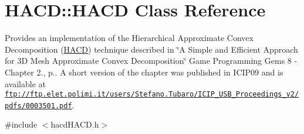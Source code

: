 \hypertarget{class_h_a_c_d_1_1_h_a_c_d}{\section{H\+A\+C\+D\+:\+:H\+A\+C\+D Class Reference}
\label{class_h_a_c_d_1_1_h_a_c_d}
}


Provides an implementation of the Hierarchical Approximate Convex Decomposition (\hyperlink{class_h_a_c_d_1_1_h_a_c_d}{H\+A\+C\+D}) technique described in \char`\"{}\+A Simple and Efficient Approach for 3\+D Mesh Approximate Convex Decomposition\char`\"{} Game Programming Gems 8 -\/ Chapter 2., p.. A short version of the chapter was published in I\+C\+I\+P09 and is available at \href{ftp://ftp.elet.polimi.it/users/Stefano.Tubaro/ICIP_USB_Proceedings_v2/pdfs/0003501.pdf}{\tt ftp\+://ftp.\+elet.\+polimi.\+it/users/\+Stefano.\+Tubaro/\+I\+C\+I\+P\+\_\+\+U\+S\+B\+\_\+\+Proceedings\+\_\+v2/pdfs/0003501.\+pdf}.  




{\ttfamily \#include $<$hacd\+H\+A\+C\+D.\+h$>$}

